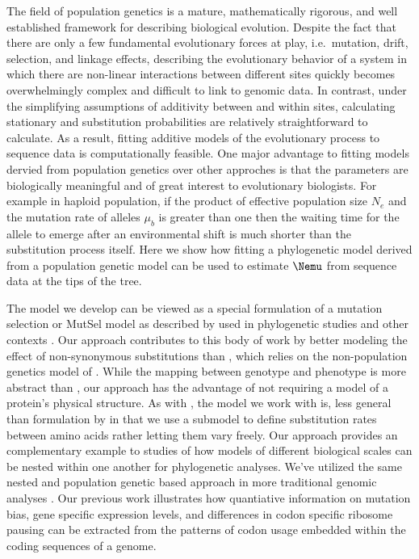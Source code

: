 \documentclass{article}
\newcommand{\Ne}{\ensuremath{{N_e}}\xspace} %
\begin{document}
The field of population genetics is a mature, mathematically rigorous, and well established framework for describing biological evolution.
Despite the fact that there are only a few fundamental evolutionary forces at play, i.e.~mutation, drift, selection, and linkage effects, describing the evolutionary behavior of a system in which there are non-linear interactions between different sites quickly becomes overwhelmingly complex and difficult to link to genomic data.
In contrast, under the simplifying assumptions of additivity between and within sites, calculating stationary and substitution probabilities are relatively straightforward to calculate.
As a result, fitting additive models of the evolutionary process to sequence data is computationally feasible.
One major advantage to fitting models dervied from population genetics over other approches is that the parameters are biologically meaningful and of great interest to evolutionary biologists.
For example in haploid population, if the product of effective population size $\Ne$ and the mutation rate of alleles $\mu_b$ is greater than one then the waiting time for the allele to emerge after an environmental shift is much shorter than the substitution process itself.
Here we show how fitting a phylogenetic model derived from a population genetic model can be used to estimate $\Nemu$ from sequence data at the tips of the tree.

The model we develop can be viewed as a special formulation of a mutation selection or MutSel model as described by \citet{Kimura1962,Wright1969,Iwasa1988,BergAndLassig2003,SellaAndHirsh2005} used in phylogenetic studies \citet[e.g.][]{MuseAndGaut1994,HalpernAndBruno1988,YangAndNielsen2008,RodrigueEtAl2005, KoshiEtAl1997,KoshiEtAl1999,DimmicEtAl2000,ThorneEtAl2012,LarriotAndPhillippe2004,RodrigueAndLartillot2014} and other contexts \citet{WilkeAndDrummond2006a,Gilchrist2007,DrummondAndWilke2009,GilchristEtAl2015}.
Our approach contributes to this body of work  by better modeling the effect of non-synonymous substitutions than \citet{YangANdNielsen2008}, which relies on the non-population genetics model of \citet{GoldmanAndYang1994}.
While the mapping between genotype and phenotype is more abstract than \citet{ThorneEtAl2012}, our approach has the advantage of not requiring a model of a protein's physical structure.
As with \citet{ThorneEtAl2012}, the model we work with is,  less general than formulation by \citet{HalpernAndBruno1988,LartillotAndPhillipe2004,RodrigueAndLartillot2014} in that we use a submodel to define substitution rates between amino acids rather letting them vary freely.
Our approach provides an complementary example to \citet{ThorneEtAl2012} studies of how models of different biological scales can be nested within one another for phylogenetic analyses.
We've utilized the same nested and population genetic based approach in more traditional genomic analyses \cite[e.g.][]{Gilchrist2007,ShahAndGilchrist2011,GilchristEtAl2015}.
Our previous work illustrates how quantiative information on mutation bias, gene specific expression levels, and differences in codon specific ribosome pausing can be extracted from the patterns of codon usage embedded within the coding sequences of a genome.
\end{document}
